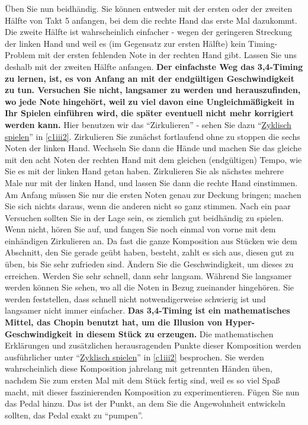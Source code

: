 Üben Sie nun beidhändig.
Sie können entweder mit der ersten oder der zweiten Hälfte von Takt 5 anfangen, bei dem die rechte Hand das erste Mal dazukommt.
Die zweite Hälfte ist wahrscheinlich einfacher - wegen der geringeren Streckung der linken Hand und weil es (im Gegensatz zur ersten Hälfte) kein Timing-Problem mit der ersten fehlenden Note in der rechten Hand gibt.
Lassen Sie uns deshalb mit der zweiten Hälfte anfangen.
\textbf{Der einfachste Weg das 3,4-Timing zu lernen, ist, es von Anfang an mit der endgültigen Geschwindigkeit zu tun.
Versuchen Sie nicht, langsamer zu werden und herauszufinden, wo jede Note hingehört, weil zu viel davon eine Ungleichmäßigkeit in Ihr Spielen einführen wird, die später eventuell nicht mehr korrigiert werden kann.}
Hier benutzen wir das \enquote{Zirkulieren} - sehen Sie dazu \enquote{\hyperref[c1iii2]{Zyklisch spielen}} in \ref*{c1iii2}.
Zirkulieren Sie zunächst fortlaufend ohne zu stoppen die sechs Noten der linken Hand.
Wechseln Sie dann die Hände und machen Sie das gleiche mit den acht Noten der rechten Hand mit dem gleichen (endgültigen) Tempo, wie Sie es mit der linken Hand getan haben.
Zirkulieren Sie als nächstes mehrere Male nur mit der linken Hand, und lassen Sie dann die rechte Hand einstimmen.
Am Anfang müssen Sie nur die ersten Noten genau zur Deckung bringen; machen Sie sich nichts daraus, wenn die anderen nicht so ganz stimmen.
Nach ein paar Versuchen sollten Sie in der Lage sein, es ziemlich gut beidhändig zu spielen.
Wenn nicht, hören Sie auf, und fangen Sie noch einmal von vorne mit dem einhändigen Zirkulieren an.
Da fast die ganze Komposition aus Stücken wie dem Abschnitt, den Sie gerade geübt haben, besteht, zahlt es sich aus, diesen gut zu üben, bis Sie sehr zufrieden sind.
Ändern Sie die Geschwindigkeit, um dieses zu erreichen.
Werden Sie sehr schnell, dann sehr langsam.
Während Sie langsamer werden können Sie sehen, wo all die Noten in Bezug zueinander hingehören.
Sie werden feststellen, dass schnell nicht notwendigerweise schwierig ist und langsamer nicht immer einfacher.
\textbf{Das 3,4-Timing ist ein mathematisches Mittel, das Chopin benutzt hat, um die Illusion von Hyper-Geschwindigkeit in diesem Stück zu erzeugen.}
Die mathematischen Erklärungen und zusätzlichen herausragenden Punkte dieser Komposition werden ausführlicher unter \enquote{\hyperref[c1iii2]{Zyklisch spielen}} in \ref*{c1iii2} besprochen.
Sie werden wahrscheinlich diese Komposition jahrelang mit getrennten Händen üben, nachdem Sie zum ersten Mal mit dem Stück fertig sind, weil es so viel Spaß macht, mit dieser faszinierenden Komposition zu experimentieren.
Fügen Sie nun das Pedal hinzu.
Das ist der Punkt, an dem Sie die Angewohnheit entwickeln sollten, das Pedal exakt zu \enquote{pumpen}.

